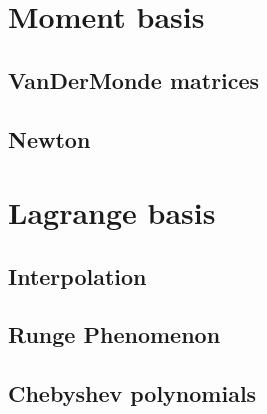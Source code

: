 \section[Moment]{Moment basis}
\label{sec:moment-basis}

\subsection[Van Der Monde]{VanDerMonde matrices}
\label{sec:vandermonde-matrices}

\begin{frame}{}
  
\end{frame}


\subsection{Newton}
\label{sec:newton}

\begin{frame}{}
  
\end{frame}

\section[Lagrange]{Lagrange basis}
\label{sec:lagrange-basis}

\subsection{Interpolation}
\label{sec:interpolation}


\begin{frame}{}
  
\end{frame}

\subsection{Runge Phenomenon}
\label{sec:runge-phenomenon}

\begin{frame}{}
  
\end{frame}

\subsection{Chebyshev polynomials}
\label{sec:chebysh-polyn}

\begin{frame}{}
  
\end{frame}

